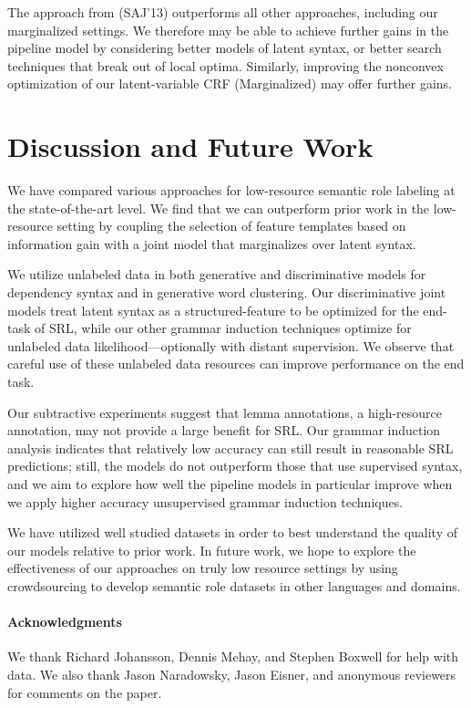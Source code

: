 \documentclass[11pt]{article}
\begin{document}
The approach from 
(SAJ'13) outperforms all other approaches, including our marginalized
settings.  We therefore may be able to achieve
further gains in the pipeline model by considering better models of
latent syntax, or better search techniques that break out of local
optima. Similarly, improving the nonconvex optimization of our
latent-variable CRF (Marginalized) may offer further gains.

\section{Discussion and Future Work}

We have compared various approaches for low-resource semantic role labeling at the state-of-the-art
level. We find that we can outperform 
prior work in the low-resource setting by coupling the selection of 
feature templates based on information gain with a joint model that 
marginalizes over latent syntax.

We utilize unlabeled data in both generative and discriminative models
for dependency syntax and in generative word clustering. Our discriminative joint
models treat latent syntax as a structured-feature to be optimized for
the end-task of SRL, while our other grammar induction techniques
optimize for unlabeled data likelihood---optionally with distant supervision. We observe that careful use of
these unlabeled data resources can improve performance on the end task.

Our subtractive experiments suggest that lemma annotations, a 
high-resource annotation, may not provide a large 
benefit for SRL.  Our grammar induction analysis indicates that 
relatively low accuracy can still result in reasonable SRL 
predictions; still, the models do not outperform those that use supervised 
syntax, and we aim to explore how well the pipeline models in 
particular improve when we apply higher accuracy unsupervised grammar induction 
techniques.

We have utilized well studied datasets in order to best
understand the quality of our models relative to prior work. In future
work, we hope to explore the effectiveness of our approaches on truly
low resource settings by using crowdsourcing to develop semantic
role datasets in other languages and domains.  

\paragraph{Acknowledgments}
We thank Richard Johansson, Dennis Mehay, and Stephen Boxwell for 
help with data.
We also thank Jason Naradowsky, Jason Eisner, and anonymous reviewers 
for comments on the paper.



\end{document}
